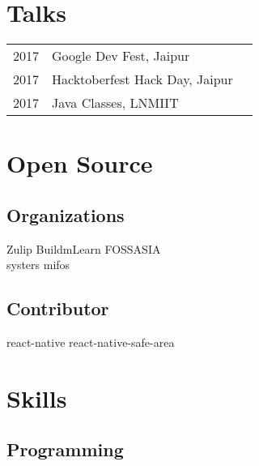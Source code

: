 \documentclass[letterpaper]{deedy-resume} %
\begin{document}
\begin{minipage}[t]{0.33\textwidth}
\sectionspace %


\section{Talks}

\begin{tabular}{rll}
2017 & Google Dev Fest, Jaipur\\
2017 & Hacktoberfest Hack Day, Jaipur\\
2017 & Java Classes, LNMIIT\\
\end{tabular}

\sectionspace %


\section{Open Source}
\subsection{Organizations}

Zulip \textbullet{} BuildmLearn  \textbullet{} FOSSASIA \\
systers \textbullet{} mifos \\

\sectionspace %

\subsection{Contributor}

\textbullet{} react-native
\textbullet{} react-native-safe-area

\sectionspace %


\section{Skills}

\subsection{Programming}


\end{minipage}
\end{document}
